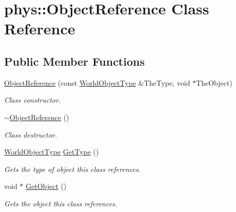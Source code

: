 \hypertarget{classphys_1_1ObjectReference}{
\section{phys::ObjectReference Class Reference}
\label{d6/d54/classphys_1_1ObjectReference}
}
\subsection*{Public Member Functions}
\begin{DoxyCompactItemize}
\item 
\hyperlink{classphys_1_1ObjectReference_aa97733aef863b81f9fdbb4455d60d7e9}{ObjectReference} (const \hyperlink{namespacephys_a56410935e1c614a932dbc91ee7330df1}{WorldObjectType} \&TheType, void $\ast$TheObject)
\begin{DoxyCompactList}\small\item\em Class constructor. \item\end{DoxyCompactList}\item 
\hypertarget{classphys_1_1ObjectReference_ae0205396bc65406316730a6cd5bdc237}{
\hyperlink{classphys_1_1ObjectReference_ae0205396bc65406316730a6cd5bdc237}{$\sim$ObjectReference} ()}
\label{d6/d54/classphys_1_1ObjectReference_ae0205396bc65406316730a6cd5bdc237}

\begin{DoxyCompactList}\small\item\em Class destructor. \item\end{DoxyCompactList}\item 
\hyperlink{namespacephys_a56410935e1c614a932dbc91ee7330df1}{WorldObjectType} \hyperlink{classphys_1_1ObjectReference_aea70ac457331e5b20a7487e2d93ba005}{GetType} ()
\begin{DoxyCompactList}\small\item\em Gets the type of object this class references. \item\end{DoxyCompactList}\item 
void $\ast$ \hyperlink{classphys_1_1ObjectReference_a729c6e6b0ec5f0bbc7eb19987235729e}{GetObject} ()
\begin{DoxyCompactList}\small\item\em Gets the object this class references. \item\end{DoxyCompactList}\end{DoxyCompactItemize}
